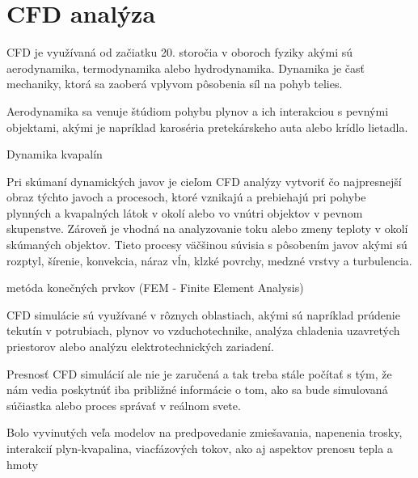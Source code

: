 \documentclass[]{tukediphc}
\begin{document}
\section{CFD analýza}

CFD je využívaná od začiatku 20. storočia v oboroch fyziky akými sú aerodynamika, termodynamika alebo hydrodynamika. Dynamika je časť mechaniky, ktorá sa zaoberá vplyvom pôsobenia síl na pohyb telies.

Aerodynamika sa venuje štúdiom pohybu plynov a ich interakciou s pevnými objektami, akými je napríklad karoséria pretekárskeho auta alebo krídlo lietadla. 

Dynamika kvapalín

Pri skúmaní dynamických javov je cieľom CFD analýzy vytvoriť čo najpresnejší obraz týchto javoch a procesoch, ktoré vznikajú a prebiehajú pri pohybe plynných a kvapalných látok v okolí alebo vo vnútri objektov v pevnom skupenstve. Zároveň je vhodná na analyzovanie toku alebo zmeny teploty v okolí skúmaných objektov. Tieto procesy väčšinou súvisia s pôsobením javov akými sú rozptyl, šírenie, konvekcia, náraz vĺn, klzké povrchy, medzné vrstvy a turbulencia.


metóda konečných prvkov (FEM - Finite Element Analysis)


CFD simulácie sú využívané v rôznych oblastiach, akými sú napríklad prúdenie tekutín v potrubiach, plynov vo vzduchotechnike, analýza chladenia uzavretých priestorov alebo analýzu elektrotechnických zariadení.

Presnosť CFD simulácií ale nie je zaručená a tak treba stále počítať s tým, že nám vedia poskytnúť iba približné informácie o tom, ako sa bude simulovaná súčiastka alebo proces správať v reálnom svete. 



Bolo vyvinutých veľa modelov na predpovedanie zmiešavania, napenenia trosky, interakcií plyn-kvapalina, viacfázových tokov, ako aj aspektov prenosu tepla a hmoty

\citep{chattopadhyay2010}
\end{document}
